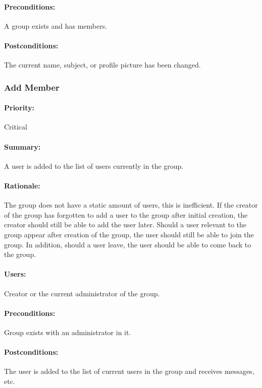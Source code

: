 \documentclass[11pt]{article}
\begin{document}
\paragraph{Preconditions:}
A group exists and has members.
\paragraph{{Postconditions:}}
The current name, subject, or profile picture has been changed.

\subsubsection{Add Member} \label{UC-add-member}
\paragraph{Priority:} Critical
\paragraph{Summary:}
A user is added to the list of users currently in the group.
\paragraph{Rationale:}
The group does not have a static amount of users, this is inefficient. If the creator of the group has forgotten to add a user to the group after initial creation, the creator should still be able to add the user later. Should a user relevant to the group appear after creation of the group, the user should still be able to join the group. In addition, should a user leave, the user should be able to come back to the group.
\paragraph{Users:}
Creator or the current administrator of the group.
\paragraph{Preconditions:}
Group exists with an administrator in it.
\paragraph{{Postconditions:}}
The user is added to the list of current users in the group and receives messages, etc.
\end{document}
